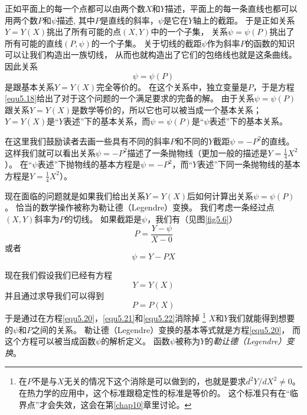 正如平面上的每一个点都可以由两个数$X$和$Y$描述，平面上的每一条直线也都可以用两个数$P$和$\psi$描述,
其中$P$是直线的斜率，$\psi$是它在$Y$轴上的截距。
于是正如关系$Y=Y(X)$挑出了所有可能的点$(X,Y)$中的一个子集，
关系$\psi=\psi(P)$挑出了所有可能的直线$(P,\psi)$的一个子集。
关于切线的截距$\psi$作为斜率$P$的函数的知识可以让我们构造出一族切线，
从而也就构造出了它们的包络线也就是这条曲线。
因此关系
\begin{equation}
\label{equ5.18}
  \psi=\psi(P)
\end{equation}
是跟基本关系$Y=Y(X)$完全等价的。
在这个关系中，独立变量是$P$，于是方程\eqref{equ5.18}给出了对于这个问题的一个满足要求的完备的解。
由于关系$\psi=\psi(P)$跟关系$Y=Y(X)$是数学等价的，所以它也可以被当成一个基本关系；
$Y=Y(X)$是“$Y$表述”下的基本关系，而$\psi=\psi(P)$是“$\psi$表述”下的基本关系。

在这里我们鼓励读者去画一些具有不同的斜率$P$和不同的$Y$截距$\psi=-P^2$的直线。
这样我们就可以看出关系$\psi=-P^2$描述了一条抛物线（更加一般的描述是$Y=\frac{1}{4}X^2$）。
在“$\psi$表述”下抛物线的基本方程是$\psi=-P^2$，而“$Y$表述”下同一条抛物线的基本方程是$Y=\frac{1}{4}X^2$）。

现在面临的问题就是如果我们给出关系$Y=Y(X)$后如何计算出关系$\psi=\psi(P)$。
恰当的数学操作被称为勒让德（Legendre）变换。
我们考虑一条经过点$(X,Y)$斜率为$P$的切线。
如果截距是$\psi$，我们有（见图\ref{fig5.6}）
\begin{equation}
\label{equ5.19}
  P=\frac{Y-\psi}{X-0}
\end{equation}
或者
\begin{equation}
\label{equ5.20}
  \psi=Y-PX
\end{equation}

现在我们假设我们已经有方程
\begin{equation}
\label{equ5.21}
  Y=Y(X)
\end{equation}
并且通过求导我们可以得到
\begin{equation}
\label{equ5.22}
  P=P(X)
\end{equation}
于是通过在方程\eqref{equ5.20}，\eqref{equ5.21}和\eqref{equ5.22}消除掉
\footnote{在$P$不是与$X$无关的情况下这个消除是可以做到的，也就是要求$d^2Y/dX^2\neq0$。
在热力学的应用中，这个标准跟稳定性的标准是等价的。
这个标准只有在“临界点”才会失效，这会在第\ref{chap10}章里讨论。}
$X$和$Y$我们就能得到想要的$\psi$和$P$之间的关系。
勒让德（Legendre）变换的基本等式就是方程\eqref{equ5.20}，
而这个方程可以被当成函数$\psi$的解析定义。
函数$\psi$被称为$Y$的{\it 勒让德（Legendre）变换}。

